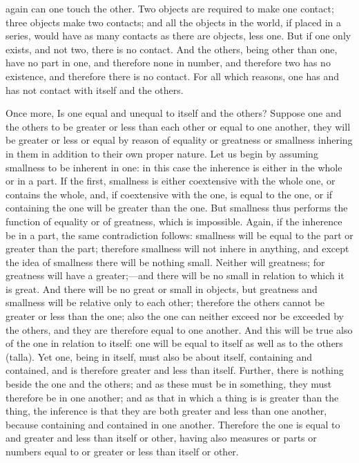 \documentclass[11pt,letter]{article}
\begin{document}
again can one touch the other. Two objects are required to make one contact; three objects make two contacts; and all the objects in the world, if placed in a series, would have as many contacts as there are objects, less one. But if one only exists, and not two, there is no contact. And the others, being other than one, have no part in one, and therefore none in number, and therefore two has no existence, and therefore there is no contact. For all which reasons, one has and has not contact with itself and the others.

\par  Once more, Is one equal and unequal to itself and the others? Suppose one and the others to be greater or less than each other or equal to one another, they will be greater or less or equal by reason of equality or greatness or smallness inhering in them in addition to their own proper nature. Let us begin by assuming smallness to be inherent in one: in this case the inherence is either in the whole or in a part. If the first, smallness is either coextensive with the whole one, or contains the whole, and, if coextensive with the one, is equal to the one, or if containing the one will be greater than the one. But smallness thus performs the function of equality or of greatness, which is impossible. Again, if the inherence be in a part, the same contradiction follows: smallness will be equal to the part or greater than the part; therefore smallness will not inhere in anything, and except the idea of smallness there will be nothing small. Neither will greatness; for greatness will have a greater;—and there will be no small in relation to which it is great. And there will be no great or small in objects, but greatness and smallness will be relative only to each other; therefore the others cannot be greater or less than the one; also the one can neither exceed nor be exceeded by the others, and they are therefore equal to one another. And this will be true also of the one in relation to itself: one will be equal to itself as well as to the others (talla). Yet one, being in itself, must also be about itself, containing and contained, and is therefore greater and less than itself. Further, there is nothing beside the one and the others; and as these must be in something, they must therefore be in one another; and as that in which a thing is is greater than the thing, the inference is that they are both greater and less than one another, because containing and contained in one another. Therefore the one is equal to and greater and less than itself or other, having also measures or parts or numbers equal to or greater or less than itself or other.
\end{document}
